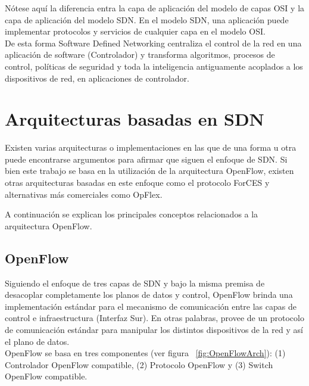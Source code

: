 N\'otese aqu\'i la diferencia entra la capa de aplicaci\'on del modelo de capas OSI y la capa de aplicaci\'on  del modelo SDN. En el modelo SDN, una aplicaci\'on puede implementar protocolos y servicios de cualquier capa en el modelo OSI.\\

De esta forma Software Defined Networking centraliza el control de la red en una aplicación de software  
 (Controlador) y transforma algoritmos, procesos de control, políticas de seguridad y toda la inteligencia antiguamente acoplados a los dispositivos de red, en aplicaciones de controlador.\\

\section{Arquitecturas basadas en SDN}
\label{section2.3}

Existen varias arquitecturas o implementaciones en las que de una forma u otra puede encontrarse argumentos para afirmar que siguen el enfoque de SDN. Si bien este trabajo se basa en la utilización de la arquitectura OpenFlow, existen otras arquitecturas basadas en este enfoque como el protocolo ForCES y alternativas m\'as comerciales como OpFlex\cite{OpFlex}.

A continuaci\'on se explican los principales conceptos relacionados a la arquitectura OpenFlow.

\subsection{OpenFlow}

Siguiendo el enfoque de tres capas de SDN y bajo la misma premisa de desacoplar completamente los planos de datos y control, OpenFlow\cite{mckeown2008openflow} brinda una implementaci\'on estándar para el mecanismo de comunicación entre las capas de control e infraestructura (Interfaz Sur). En otras palabras, provee de un protocolo de comunicación estándar para manipular los distintos dispositivos de la red y así el plano de datos.\\ 

OpenFlow se basa en tres componentes (ver figura ~\ref{fig:OpenFlowArch}): (1) Controlador OpenFlow compatible, (2) Protocolo OpenFlow y (3) Switch OpenFlow compatible.

  

